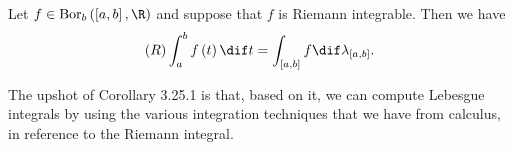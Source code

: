 \documentclass[pmath450]{subfiles}
\begin{document}
    \begin{cor}{}
        Let $f\in\bor_b\left( \left[ a,b \right],\R \right)$ and suppose that $f$ is Riemann integrable. Then we have
        \begin{equation*}
            \left( R \right)\int^{b}_{a}f\left( t \right)\dif t = \int_{\left[ a,b \right]}f\dif\lambda_{\left[ a,b \right]}.
        \end{equation*}
    \end{cor}	


    \np The upshot of Corollary 3.25.1 is that, based on it, we can compute Lebesgue integrals by using the various integration techniques that we have from calculus, in reference to the Riemann integral.
\end{document}
